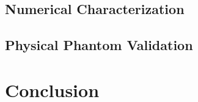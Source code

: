 		\subsection{Numerical Characterization}

		\subsection{Physical Phantom Validation}

	\section{Conclusion}

